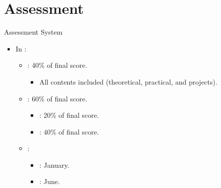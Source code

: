 \section{Assessment}

\begin{frame}[t]{Assessment System}
\begin{itemize}
  \item In :

    \begin{itemize}
      \item {}: 40\% of final score.
        \begin{itemize}
          \item All contents included (theoretical, practical, and projects).
        \end{itemize}

      \item {}: 60\% of final score.
        \begin{itemize}
          \item {}: 20\% of final score.
          \item {}: 40\% of final score.
        \end{itemize}

    \item {}:
      \begin{itemize}
        \item {}: January.
        \item {}: June.
      \end{itemize}
  \end{itemize}
\end{itemize}
\end{frame}

